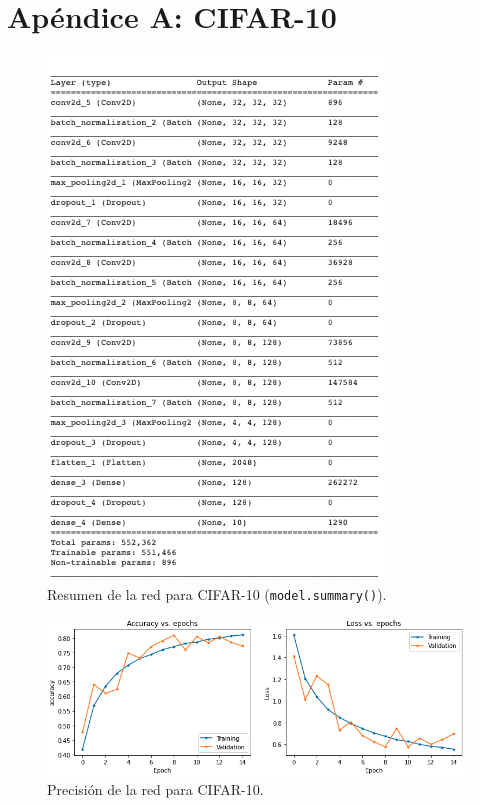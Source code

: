 \section{Apéndice A: CIFAR-10}

\begin{figure}[h!]
    \centering
    \includegraphics[width=0.8\textwidth]{images/model_details/cifar_summary.png}
    \caption{Resumen de la red para CIFAR-10 (\texttt{model.summary()}).}
    \label{cifar summary}
\end{figure}

\begin{figure}[h!]
    \centering
    \includegraphics[width=\textwidth]{images/model_details/cifar_train.png}
    \caption{Precisión de la red para CIFAR-10.}
    \label{}
\end{figure}
